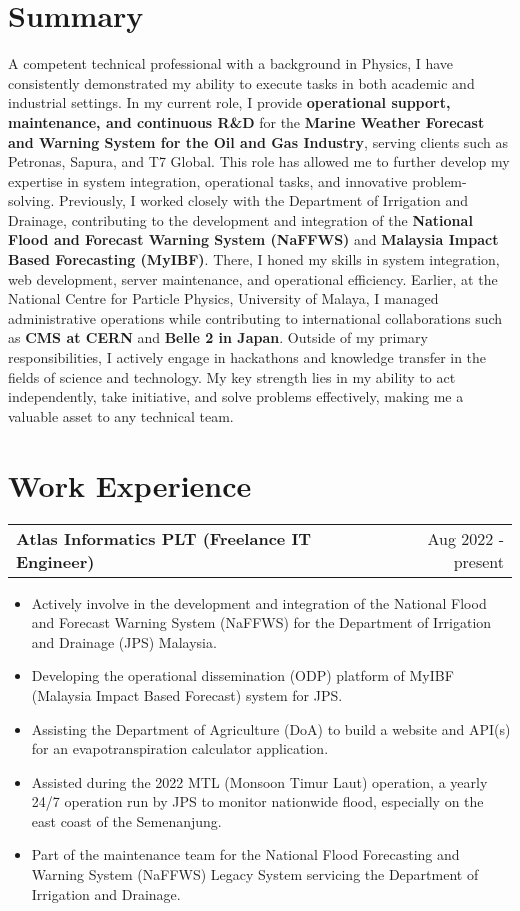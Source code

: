 \documentclass[a4paper,12pt]{article}
\makeatletter
\newenvironment{joblong}[2]
    {
    \begin{tabularx}{\linewidth}{@{}l X r@{}}
    \textbf{#1} & \hfill &  #2 \\[3.75pt]
    \end{tabularx}
    \begin{minipage}[t]{\linewidth}
    \begin{itemize}[nosep,after=\strut, leftmargin=1em, itemsep=3pt,label=--]
    }
    {
    \end{itemize}
    \end{minipage}    
    }
\makeatother
\begin{document}
\section{Summary}
A competent technical professional with a background in Physics, I have consistently demonstrated my ability to execute tasks in both academic and industrial settings. In my current role, I provide \textbf{operational support, maintenance, and continuous R\&D} for the \textbf{Marine Weather Forecast and Warning System for the Oil and Gas Industry}, serving clients such as Petronas, Sapura, and T7 Global. This role has allowed me to further develop my expertise in system integration, operational tasks, and innovative problem-solving. Previously, I worked closely with the Department of Irrigation and Drainage, contributing to the development and integration of the \textbf{National Flood and Forecast Warning System (NaFFWS)} and \textbf{Malaysia Impact Based Forecasting (MyIBF)}. There, I honed my skills in system integration, web development, server maintenance, and operational efficiency. Earlier, at the National Centre for Particle Physics, University of Malaya, I managed administrative operations while contributing to international collaborations such as \textbf{CMS at CERN} and \textbf{Belle 2 in Japan}. Outside of my primary responsibilities, I actively engage in hackathons and knowledge transfer in the fields of science and technology. My key strength lies in my ability to act independently, take initiative, and solve problems effectively, making me a valuable asset to any technical team.

\section{Work Experience}

\begin{joblong}{Atlas Informatics PLT (Freelance IT Engineer)}{Aug 2022 - present}
\item Actively involve in the development and integration of the National Flood and Forecast Warning System (NaFFWS) for the Department of Irrigation and Drainage (JPS) Malaysia.
\item Developing the operational dissemination (ODP) platform of MyIBF (Malaysia Impact Based Forecast) system for JPS.
\item Assisting the Department of Agriculture (DoA) to build a website and API(s) for an evapotranspiration calculator application.
\item Assisted during the 2022 MTL (Monsoon Timur Laut) operation, a yearly 24/7 operation run by JPS to monitor nationwide flood, especially on the east coast of the Semenanjung.
\item Part of the maintenance team for the National Flood Forecasting and Warning System (NaFFWS) Legacy System servicing the Department of Irrigation and Drainage.
\end{joblong}
\end{document}
